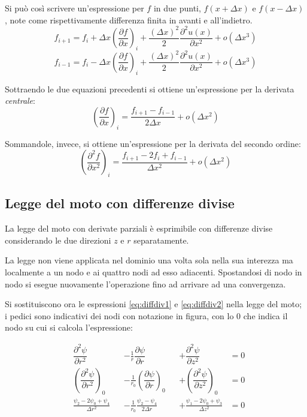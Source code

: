 \documentclass{tufte-handout}
\newcommand{\de}[2]{\dfrac{\partial #1}{\partial #2}}
\newcommand{\dede}[2]{\dfrac{\partial^2 #1}{\partial #2^2}}
\begin{document}
Si può così scrivere un'espressione per $f$ in due punti, $f(x+\Delta x)$ e $f(x-\Delta x)$, note come rispettivamente differenza finita in avanti e all'indietro.
\begin{equation*}
    f_{i+1} = f_{i} + \Delta x \left(\de{f}{x}\right)_i + 
    \frac{(\Delta x)^2}{2} \dede{u(x)}{x} + 
    o(\Delta x^3)
\end{equation*}
\begin{equation*}
    f_{i-1} = f_{i} - \Delta x \left(\de{f}{x}\right)_i + 
    \frac{(\Delta x)^2}{2} \dede{u(x)}{x} + 
    o(\Delta x^3)
\end{equation*}

Sottraendo le due equazioni precedenti si ottiene un'espressione per la derivata \emph{centrale}:
\begin{equation}
    \left(\de{f}{x} \right)_i = \frac{f_{i+1}-f_{i-1}}{2\Delta x} + o(\Delta x^2)
    \label{eq:diffdiv1}
\end{equation}

Sommandole, invece, si ottiene un'espressione per la derivata del secondo ordine:
\begin{equation}
    \left(\dede{f}{x} \right)_i = \frac{f_{i+1}-2f_{i}+f_{i-1}}{\Delta x^2} + o(\Delta x^2)
    \label{eq:diffdiv2}
\end{equation}

\subsection{Legge del moto con differenze divise}
La legge del moto con derivate parziali è esprimibile con differenze divise considerando le due direzioni $z$ e $r$ separatamente.

La legge non viene applicata nel dominio una volta sola nella sua interezza ma localmente a un nodo e ai quattro nodi ad esso adiacenti. Spostandosi di nodo in nodo si esegue nuovamente l'operazione fino ad arrivare ad una convergenza.

Si sostituiscono ora le espressioni \ref{eq:diffdiv1} e \ref{eq:diffdiv2} nella legge del moto; i pedici sono indicativi dei nodi con notazione in figura, con lo $0$ che indica il nodo su cui si calcola l'espressione:
\begin{fullwidth}
    \begin{align*}
        &\dede{\psi}{r} & &-\frac{1}{r}\de{\psi}{r} & &+ \dede{\psi}{z} &= 0 \\
        &\left(\dede{\psi}{r} \right)_0 &
        &-\frac{1}{r_0}\left(\de{\psi}{r} \right)_0 &
        &+\left(\dede{\psi}{z} \right)_0
        &= 0 \\
        &\frac{\psi_2-2\psi_0+\psi_4}{\Delta r^2} &
        &- \frac{1}{r_0} \frac{\psi_2-\psi_4}{2 \Delta r} &
        &+\frac{\psi_1-2\psi_0+\psi_3}{\Delta z^2}
        &=0
    \end{align*}
\end{fullwidth}
\end{document}
